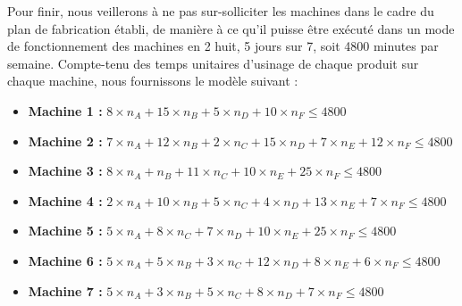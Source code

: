 \documentclass[a4paper,10pt]{article}
\begin{document}
Pour finir, nous veillerons à ne pas sur-solliciter les machines dans le cadre du plan de fabrication établi, de manière à ce qu'il puisse être exécuté dans un mode de fonctionnement des machines en 2 huit, 5 jours sur 7, soit 4800 minutes par semaine. Compte-tenu des temps unitaires d'usinage de chaque produit sur chaque machine, nous fournissons le modèle suivant :
\newline
\begin{itemize}
\item[\textbullet] \textbf{Machine 1 :} $8 \times n_A + 15 \times n_B + 5 \times n_D + 10 \times n_F \leq 4800$
\item[\textbullet] \textbf{Machine 2 :} $7 \times n_A + 12 \times n_B +2 \times n_C + 15 \times n_D + 7 \times n_E + 12 \times n_F \leq 4800$
\item[\textbullet] \textbf{Machine 3 :} $8 \times n_A + n_B + 11 \times n_C + 10 \times n_E + 25 \times n_F \leq 4800$
\item[\textbullet] \textbf{Machine 4 :} $2 \times n_A + 10 \times n_B + 5 \times n_C + 4 \times n_D + 13 \times n_E + 7 \times n_F \leq 4800$
\item[\textbullet] \textbf{Machine 5 :} $5 \times n_A + 8 \times n_C + 7 \times n_D + 10 \times n_E + 25 \times n_F \leq 4800$
\item[\textbullet] \textbf{Machine 6 :} $5 \times n_A + 5 \times n_B + 3 \times n_C + 12 \times n_D + 8 \times n_E + 6 \times n_F \leq 4800$
\item[\textbullet] \textbf{Machine 7 :} $5 \times n_A + 3 \times n_B +5 \times n_C +8 \times n_D + 7 \times n_F \leq 4800 $\newline
\end{itemize}


\vspace{\baselineskip}
\end{document}

